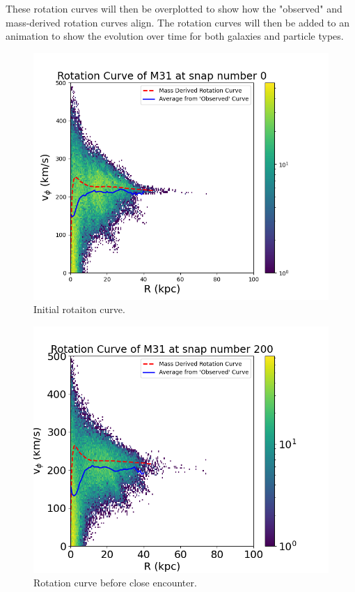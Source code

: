 \documentclass[twocolumn,linenumbers,trackchanges]{aastex7}
\begin{document}
These rotation curves will then be overplotted to show how the "observed" and mass-derived rotation curves align.
The rotation curves will then be added to an animation to show the evolution over time for both galaxies and particle types.


\begin{figure}[ht!]
	\centering
	\includegraphics[width=1.0\linewidth]{M31_000_rotation_curve.png}
	\caption{Initial rotaiton curve.}
\end{figure}

\begin{figure}[ht!]
	\centering
	\includegraphics[width=1.0\linewidth]{M31_200_rotation_curve.png}
	\caption{Rotation curve before close encounter.}
\end{figure}
\end{document}
